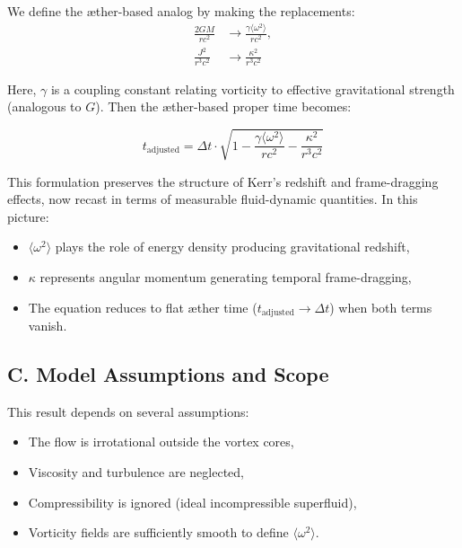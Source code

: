 We define the æther-based analog by making the replacements:
\begin{equation}
    \begin{aligned}
        \frac{2GM}{rc^2} &\rightarrow \frac{\gamma \langle \omega^2 \rangle}{rc^2}, \\
        \frac{J^2}{r^3c^2} &\rightarrow \frac{\kappa^2}{r^3c^2}
    \end{aligned}
    \tag{23}
\end{equation}

Here, $\gamma$ is a coupling constant relating vorticity to effective gravitational strength (analogous to $G$). Then the æther-based proper time becomes:

\begin{equation}
    \boxed{t_{\text{adjusted}} = \Delta t \cdot \sqrt{1 - \frac{\gamma \langle \omega^2 \rangle}{rc^2} - \frac{\kappa^2}{r^3c^2}}}
    \tag{Kerr-Like Time Dilation from Vorticity and Circulation}
\end{equation}

This formulation preserves the structure of Kerr’s redshift and frame-dragging effects, now recast in terms of measurable fluid-dynamic quantities. In this picture:
\begin{itemize}
    \item $\langle \omega^2 \rangle$ plays the role of energy density producing gravitational redshift,
    \item $\kappa$ represents angular momentum generating temporal frame-dragging,
    \item The equation reduces to flat æther time ($t_{\text{adjusted}} \to \Delta t$) when both terms vanish.
\end{itemize}

\subsection*{C. Model Assumptions and Scope}

This result depends on several assumptions:
\begin{itemize}
    \item The flow is irrotational outside the vortex cores,
    \item Viscosity and turbulence are neglected,
    \item Compressibility is ignored (ideal incompressible superfluid),
    \item Vorticity fields are sufficiently smooth to define $\langle \omega^2 \rangle$.
\end{itemize}


